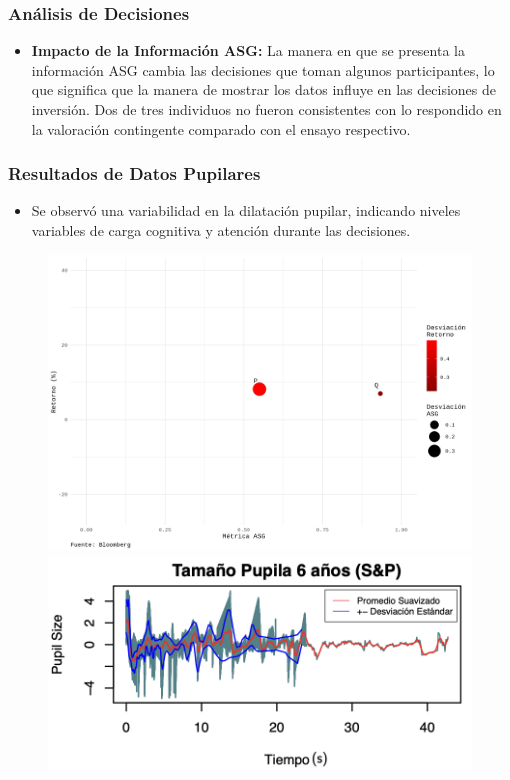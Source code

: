 \documentclass{beamer}
\begin{document}
\begin{frame}
    \frametitle{Análisis de Decisiones}
    \begin{itemize}
        
        \item \textbf{Impacto de la Información ASG:} La manera en que se presenta la información ASG cambia las decisiones que toman algunos participantes, lo que significa que la manera de mostrar los datos influye en las decisiones de inversión. Dos de tres individuos no fueron consistentes con lo respondido en la valoración contingente comparado con el ensayo respectivo.
    \end{itemize}
\end{frame}

\begin{frame}
    \frametitle{Resultados de Datos Pupilares}
    \begin{itemize}
        \item Se observó una variabilidad en la dilatación pupilar, indicando niveles variables de carga cognitiva y atención durante las decisiones.
    \end{itemize}
    \begin{figure}[h!]
    \centering
    \begin{minipage}{0.4\textwidth}
        \centering
        \includegraphics[width=\linewidth]{ESG_Exp/plots/plot_6YTD.png}
    \end{minipage}
    \hspace{0.05\textwidth} %
    \begin{minipage}{0.4\textwidth}
        \centering
        \includegraphics[width=\linewidth]{EjemploDilatacion.png}

\end{minipage}
\end{figure}
\end{frame}
\end{document}
